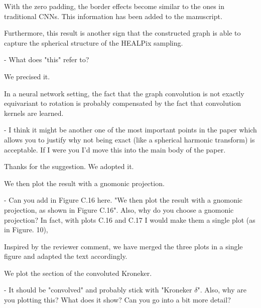 \documentclass[12pt,a4paper]{article}
\newcommand{\mdeff}[1]{{\color[rgb]{.1,.6,.1}{MD: #1}}}
\newcommand{\todo}[1]{{\color[rgb]{.6,.1,.6}{TODO: #1}}}
\newcommand{\1}{\b{1}}              %
\newcommand{\0}{\b{0}}              %
\begin{document}
With the zero padding, the border effects become similar to the ones in traditional CNNs.
This information has been added to the manuscript.

\begin{mdframed}[style=comment]
Furthermore, this result is another sign that the constructed graph is able to capture the spherical structure of the HEALPix sampling.

- What does "this" refer to?
\end{mdframed}

We precised it.

\begin{mdframed}[style=comment]
In a neural network setting, the fact that the graph convolution is not exactly equivariant to rotation is probably compensated by the fact that convolution kernels are learned.

- I think it might be another one of the most important points in the paper which allows you to justify why not being exact (like a spherical harmonic transform) is acceptable. If I were you I'd move this into the main body of the paper.
\end{mdframed}

Thanks for the suggestion.
We adopted it.



\begin{mdframed}[style=comment]
We then plot the result with a gnomonic projection.

- Can you add in Figure C.16 here. "We then plot the result with a gnomonic projection, as shown in Figure C.16". Also, why do you choose a gnomonic projection? In fact, with plots C.16 and C.17 I would make them a single plot (as in Figure. 10),
\end{mdframed}

Inspired by the reviewer comment, we have merged the three plots in a single figure and adapted the text accordingly.

\begin{mdframed}[style=comment]
We plot the section of the convoluted Kroneker.

- It should be "convolved" and probably stick with "Kroneker $\delta$". Also, why are you plotting this? What does it show? Can you go into a bit more detail?
\end{mdframed}
\end{document}
